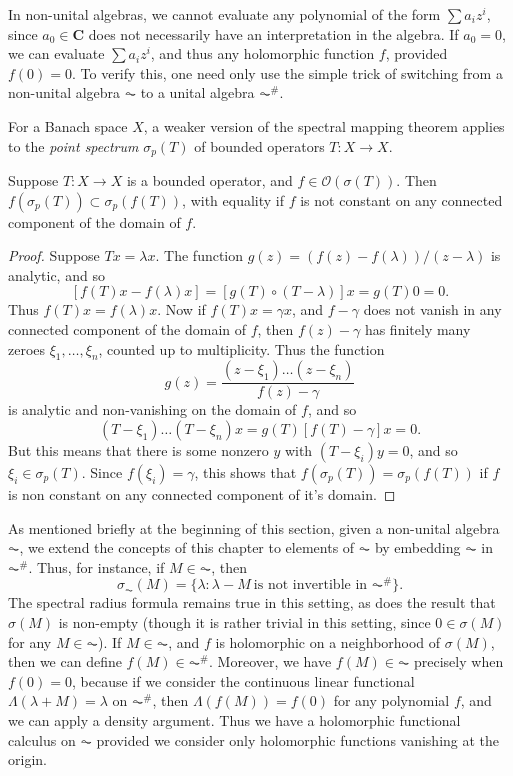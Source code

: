 In non-unital algebras, we cannot evaluate any polynomial of the form $\sum a_i z^i$, since $a_0 \in \mathbf{C}$ does not necessarily have an interpretation in the algebra. If $a_0 = 0$, we can evaluate $\sum a_i z^i$, and thus any holomorphic function $f$, provided $f(0) = 0$. To verify this, one need only use the simple trick of switching from a non-unital algebra $\AC$ to a unital algebra $\AC^\#$.

For a Banach space $X$, a weaker version of the spectral mapping theorem applies to the \emph{point spectrum} $\sigma_p(T)$ of bounded operators $T: X \to X$.

\begin{theorem}
    Suppose $T: X \to X$ is a bounded operator, and $f \in \mathcal{O}(\sigma(T))$. Then $f(\sigma_p(T)) \subset \sigma_p(f(T))$, with equality if $f$ is not constant on any connected component of the domain of $f$.
\end{theorem}
\begin{proof}
    Suppose $Tx = \lambda x$. The function $g(z) = (f(z) - f(\lambda)) / (z - \lambda)$ is analytic, and so
    \[ [f(T) x - f(\lambda) x] = [g(T) \circ (T - \lambda)] x = g(T) 0 = 0. \]
    Thus $f(T) x = f(\lambda) x$. Now if $f(T) x = \gamma x$, and $f - \gamma$ does not vanish in any connected component of the domain of $f$, then $f(z) - \gamma$ has finitely many zeroes $\xi_1, \dots, \xi_n$, counted up to multiplicity. Thus the function
    \[ g(z) = \frac{(z - \xi_1) \dots (z - \xi_n)}{f(z) - \gamma} \]
    is analytic and non-vanishing on the domain of $f$, and so
    \[ (T - \xi_1) \dots (T - \xi_n) x = g(T) [f(T) - \gamma] x = 0. \]
    But this means that there is some nonzero $y$ with $(T - \xi_i) y = 0$, and so $\xi_i \in \sigma_p(T)$. Since $f(\xi_i) = \gamma$, this shows that $f(\sigma_p(T)) = \sigma_p(f(T))$ if $f$ is non constant on any connected component of it's domain.
\end{proof}

As mentioned briefly at the beginning of this section, given a non-unital algebra $\AC$, we extend the concepts of this chapter to elements of $\AC$ by embedding $\AC$ in $\AC^\#$. Thus, for instance, if $M \in \AC$, then
%
\[ \sigma_{\AC}(M) = \{ \lambda : \lambda - M\ \text{is not invertible in $\AC^\#$} \}. \]
%
The spectral radius formula remains true in this setting, as does the result that $\sigma(M)$ is non-empty (though it is rather trivial in this setting, since $0 \in \sigma(M)$ for any $M \in \AC$). If $M \in \AC$, and $f$ is holomorphic on a neighborhood of $\sigma(M)$, then we can define $f(M) \in \AC^\#$. Moreover, we have $f(M) \in \AC$ precisely when $f(0) = 0$, because if we consider the continuous linear functional $\Lambda(\lambda + M) = \lambda$ on $\AC^\#$, then $\Lambda(f(M)) = f(0)$ for any polynomial $f$, and we can apply a density argument. Thus we have a holomorphic functional calculus on $\AC$ provided we consider only holomorphic functions vanishing at the origin.








